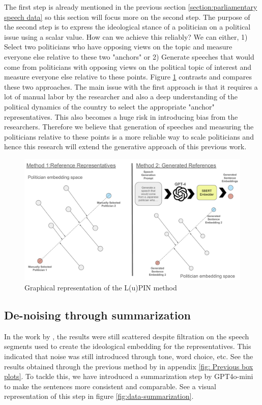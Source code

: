 \documentclass[final,5p,times,twocolumn,authoryear]{elsarticle}
\begin{document}
The first step is already mentioned in the previous section \ref{section:parliamentary speech data} so this section will focus more on the second step. The purpose of the second step is to express the ideological stance of a politician on a political issue using a scalar value. How can we achieve this reliably? We can either, 1) Select two politicians who have opposing views on the topic and measure everyone else relative to these two "anchors" or 2) Generate speeches that would come from politicians with opposing views on the political topic of interest and measure everyone else relative to these points. Figure \ref{fig:lupin-projection} contrasts and compares these two approaches. The main issue with the first approach is that it requires a lot of manual labor by the researcher and also a deep understanding of the political dynamics of the country to select the appropriate "anchor" representatives. This also becomes a huge risk in introducing bias from the researchers. Therefore we believe that generation of speeches and measuring the politicians relative to these points is a more reliable way to scale politicians and hence this research will extend the generative approach of this previous work.



\begin{figure}[h]
\centering
  \centering
  \includegraphics[width=1\linewidth]{figs/projectionphase.pdf}
  \caption{Graphical representation of the L(u)PIN method \citep{kato2024lupinllmbasedpoliticalideology}}
  \label{fig:lupin-projection}
\end{figure}

\subsection{De-noising through summarization}
\label{section: denoising}
In the work by \citeauthor{kato2024lupinllmbasedpoliticalideology}, the results were still scattered despite filtration on the speech segments used to create the ideological embedding for the representatives. This indicated that noise was still introduced through tone, word choice, etc. See the results obtained through the previous method by \citeauthor{kato2024lupinllmbasedpoliticalideology} in appendix \ref{fig: Previous box plots}. To tackle this, we have introduced a summarization step by GPT4o-mini to make the sentences more consistent and comparable. See a visual representation of this step in figure \ref{fig:data-summarization}. 
\end{document}
